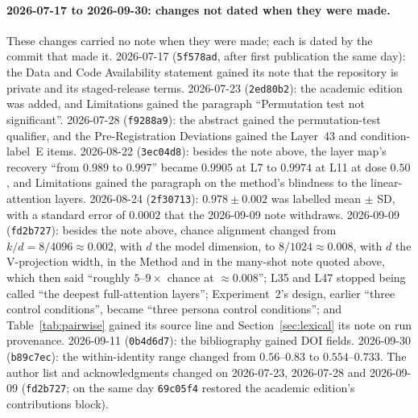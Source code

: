 \documentclass[11pt,a4paper]{article}
\begin{document}
\paragraph{2026-07-17 to 2026-09-30: changes not dated when they were made.}
These changes carried no note when they were made; each is dated by the
commit that made it. 2026-07-17 (\texttt{5f578ad}, after first publication
the same day): the Data and Code Availability statement gained its note
that the repository is private and its staged-release terms. 2026-07-23
(\texttt{2ed80b2}): the academic edition was added, and Limitations gained
the paragraph ``Permutation test not significant''. 2026-07-28
(\texttt{f9288a9}): the abstract gained the permutation-test qualifier, and
the Pre-Registration Deviations gained the Layer~43 and condition-label~E
items. 2026-08-22 (\texttt{3ec04d8}): besides the note above, the layer
map's recovery ``from $0.989$ to $0.997$'' became $0.9905$ at L7 to
$0.9974$ at L11 at dose $0.50$, and Limitations gained the paragraph on the
method's blindness to the linear-attention layers. 2026-08-24
(\texttt{2f30713}): $0.978 \pm 0.002$ was labelled mean $\pm$ SD, with a
standard error of $0.0002$ that the 2026-09-09 note withdraws. 2026-09-09
(\texttt{fd2b727}): besides the note above, chance alignment changed from
$k/d = 8/4096 \approx 0.002$, with $d$ the model dimension, to
$8/1024 \approx 0.008$, with $d$ the V-projection width, in the Method and
in the many-shot note quoted above, which then said ``roughly
$5$--$9\times$ chance at ${\approx}0.008$''; L35 and L47 stopped being
called ``the deepest full-attention layers''; Experiment~2's design, earlier
``three control conditions'', became ``three persona control conditions'';
and Table~\ref{tab:pairwise} gained its source line and
Section~\ref{sec:lexical} its note on run provenance. 2026-09-11
(\texttt{0b4d6d7}): the bibliography gained DOI fields. 2026-09-30
(\texttt{b89c7ec}): the within-identity range changed from $0.56$--$0.83$
to $0.554$--$0.733$. The author list and acknowledgments changed on
2026-07-23, 2026-07-28 and 2026-09-09 (\texttt{fd2b727}; on the same day
\texttt{69c05f4} restored the academic edition's contributions block).
\end{document}
